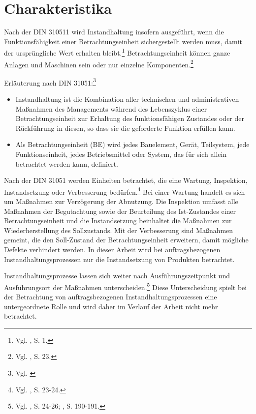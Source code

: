 \section{Charakteristika}

Nach der DIN 310511 wird Instandhaltung insofern ausgeführt, wenn die Funktionsfähigkeit einer Betrachtungseinheit sichergestellt werden muss, damit der ursprüngliche Wert erhalten bleibt.\footnote{Vgl. \cite{Strunz:2012aa}, S. 1.} Betrachtungseinheit können ganze Anlagen und Maschinen sein oder nur einzelne Komponenten.\footnote{Vgl. \cite{schenk2010techSys}, S. 23.}

Erläuterung nach DIN 31051:\footnote{Vgl. \cite{DIN}}
\begin{itemize}
\item Instandhaltung ist die Kombination aller technischen und administrativen Maßnahmen des Managements während des Lebenszyklus einer Betrachtungseinheit zur Erhaltung des funktionsfähigen Zustandes oder der Rückführung in diesen, so dass sie die geforderte Funktion erfüllen kann.
\item Als Betrachtungseinheit (BE) wird jedes Bauelement, Gerät, Teilsystem, jede Funktionseinheit, jedes Betriebsmittel oder System, das für sich allein betrachtet werden kann, definiert.
\end{itemize}

Nach der DIN 31051 werden Einheiten betrachtet, die eine Wartung, Inspektion, Instandsetzung oder Verbesserung bedürfen.\footnote{Vgl. \cite{schenk2010techSys}, S. 23-24.} Bei einer Wartung handelt es sich um Maßnahmen zur Verzögerung der Abnutzung. Die Inspektion umfasst alle Maßnahmen der Begutachtung sowie der Beurteilung des Ist-Zustandes einer Betrachtungseinheit und die Instandsetzung beinhaltet die Maßnahmen zur Wiederherstellung des Sollzustands. Mit der Verbesserung sind Maßnahmen gemeint, die den Soll-Zustand der Betrachtungseinheit erweitern, damit mögliche Defekte verhindert werden. In dieser Arbeit wird bei auftragsbezogenen Instandhaltungsprozessen nur die Instandsetzung von Produkten betrachtet.

Instandhaltungsprozesse lassen sich weiter nach Ausführungszeitpunkt und Ausführungsort der Maßnahmen unterscheiden.\footnote{Vgl. \cite{schenk2010techSys}, S. 24-26; \cite{hinsch2010instandhaltung}, S. 190-191.} Diese Unterscheidung spielt bei der Betrachtung von auftragsbezogenen Instandhaltungsprozessen eine untergeordnete Rolle und wird daher im Verlauf der Arbeit nicht mehr betrachtet.

